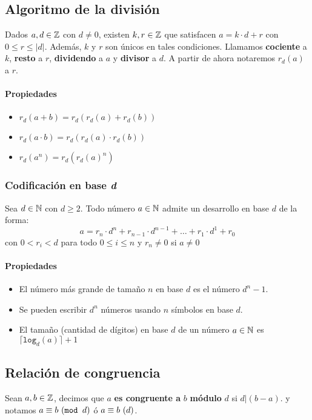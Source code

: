 \subsection{Algoritmo de la división}
Dados $a,d\in\mathbb{Z}$ con $d\neq0$, existen $k,r\in\mathbb{Z}$ que satisfacen $a = k\cdot d + r$ con $0\leq r\leq|d|$. Además, $k$ y $r$ son únicos en tales condiciones. Llamamos \textbf{cociente} a $k$, \textbf{resto} a $r$, \textbf{dividendo} a $a$ y \textbf{divisor} a $d$.
A partir de ahora notaremos $r_d(a)$ a $r$.

\paragraph{Propiedades}
\begin{itemize}
\item $r_d(a+b) = r_d(r_d(a) + r_d(b))$
\item $r_d(a\cdot b) = r_d(r_d(a)\cdot r_d(b))$
\item $r_d(a^n) = r_d(r_d(a)^n)$
\end{itemize}

\subsubsection{Codificación en base \textit{d}}
Sea $d\in\mathbb{N}$ con $d\geq2$. Todo número $a\in\mathbb{N}$ admite un desarrollo en base $d$ de la forma:
$$a = r_n\cdot d^n + r_{n-1}\cdot d^{n-1} + \dots + r_1\cdot d^1 + r_0$$ con $0 < r_i < d$ para todo $0 \leq i \leq n$ y $r_n\neq 0$ si $a\neq 0$

\paragraph{Propiedades}
\begin{itemize}
\item El número más grande de tamaño $n$ en base $d$ es el número $d^n - 1$.
\item Se pueden escribir $d^n$ números usando $n$ símbolos en base $d$.
\item El tamaño (cantidad de dígitos) en base $d$ de un número $a\in\mathbb{N}$ es $\lceil\texttt{log}_d(a)\rceil + 1$
\end{itemize}

\subsection{Relación de congruencia}
Sean $a,b\in\mathbb{Z}$, decimos que $a$ \textbf{es congruente a} $b$ \textbf{módulo} $d$ si $d|(b-a)$. y notamos $a \equiv b ~(\texttt{mod } d)$ ó $a \equiv b ~(d)$.

